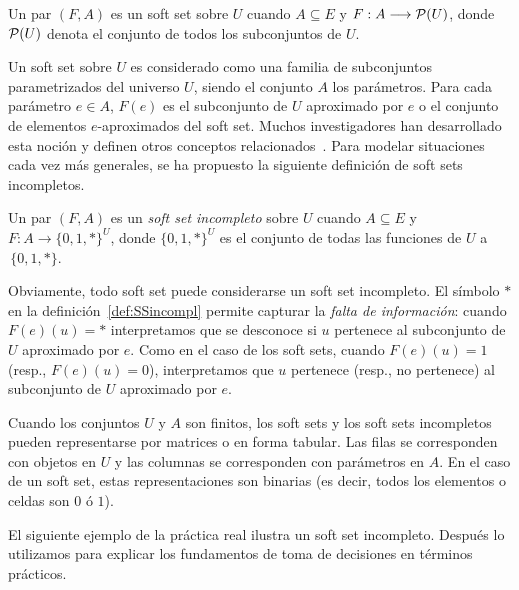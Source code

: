 \begin{definition}
Un par $(F,A)$ es un soft set sobre $U$ cuando $A\subseteq E$ y $F: A \longrightarrow {\cal P}(U)$, donde ${\cal P}(U)$ denota el conjunto de todos los subconjuntos de $U$.
\end{definition}

Un soft set sobre $U$ es considerado como una familia de subconjuntos parametrizados del universo $U$, siendo el conjunto $A$ los parámetros. Para cada parámetro $e\in A$, $F(e)$ es el subconjunto de $U$ aproximado por $e$ o el conjunto de elementos $e$-aproximados del soft set. Muchos investigadores han desarrollado esta noción y definen otros conceptos relacionados~\citep{MajiBR03,FengLi}.
Para modelar situaciones cada vez más generales, se ha propuesto la siguiente definición de soft sets incompletos.


\begin{definition}\label{def:SSincompl}
Un par $(F,A)$ es un \textit{soft set incompleto} sobre $U$ cuando $A\subseteq E$ y $F: A \longrightarrow \{0, 1, *\}^U$, donde $\{0, 1, *\}^U$ es el conjunto de todas las funciones de $U$ a $\, \{0, 1, *\}$. 
\end{definition}

Obviamente, todo soft set puede considerarse un soft set incompleto. El símbolo $*$ en la definición~\ref{def:SSincompl} permite capturar la \textit{falta de información}: cuando $F(e)(u)=*$ interpretamos que se desconoce si $u$ pertenece al subconjunto de $U$ aproximado por $e$. Como en el caso de los soft sets, cuando $F(e)(u)=1$ (resp., $F(e)(u)=0$), interpretamos que $u$ pertenece (resp., no pertenece) al subconjunto de $U$ aproximado por $e$. 
\smallskip

Cuando los conjuntos $U$ y $A$ son finitos, los soft sets y los soft sets incompletos pueden representarse por matrices o en forma tabular. Las filas se corresponden con objetos en $U$ y las columnas se corresponden con parámetros en $A$. En el caso de un soft set, estas representaciones son binarias (es decir, todos los elementos o celdas son $0$ ó $1$).

El siguiente ejemplo de la práctica real ilustra un soft set incompleto. Después lo utilizamos para explicar los fundamentos de toma de decisiones en términos prácticos. 

